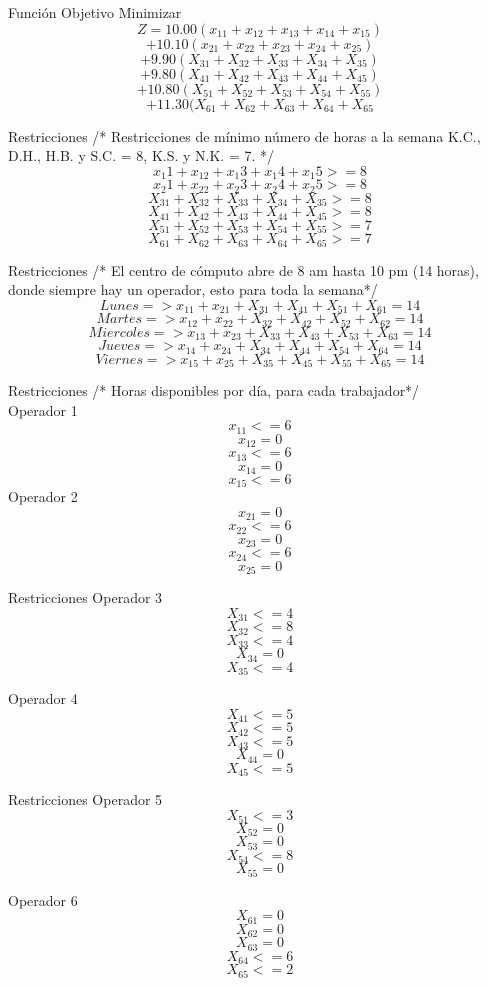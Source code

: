 \documentclass{beamer}
\begin{document}
\begin{frame}[fragile]{Funci\'on Objetivo}
Minimizar
\[Z = 10.00 (x_{11} + x_{12} +x_{13}+x_{14} +x_{15}) \]
\[+ 10.10 (x_{21} + x_{22} +x_{23}+x_{24} + x_{25})\]
\[+  9.90 (X_{31} + X_{32} +X_{33}+X_{34} +X_{35})\]
\[+ 9.80  (X_{41} + X_{42} +X_{43}+X_{44} +X_{45})\]
\[+ 10.80  (X_{51} + X_{52} +X_{53}+X_{54} +X_{55})\]
\[+ 11.30  (X_{61} + X_{62} +X_{63}+X_{64} +X_{65}\]

\end{frame}

\begin{frame}[fragile]{Restricciones}
/* Restricciones  de m\'inimo n\'umero de horas a la semana K.C., D.H., H.B. y S.C. = 8, K.S. y N.K. = 7. */\\
\[x_{1}1 + x_{12} +x_{1}3+x_{1}4 +x_{1}5 >=8\]
\[x_{2}1 + x_{22} +x_{2}3+x_{2}4 + x_{2}5 >= 8\]
\[X_{31} + X_{32} +X_{33}+X_{34} +X_{35} >= 8\]
\[X_{41} + X_{42} +X_{43}+X_{44} +X_{45} >= 8\]
\[X_{51} + X_{52} +X_{53}+X_{54} +X_{55} >= 7\]
\[X_{61} + X_{62} +X_{63}+X_{64} +X_{65} >= 7\]
\end{frame}
\begin{frame}[fragile]{Restricciones}
/* El centro de c\'omputo abre de 8 am hasta 10 pm  (14 horas), donde siempre hay un operador, esto para toda la semana*/\\
\[Lunes => x_{11} + x_{21} + X_{31} +X_{41} + X_{51} +X_{61} = 14  \]
\[Martes=> x_{12} + x_{22} + X_{32} +X_{42} + X_{52} + X_{62} = 14\]
\[Miercoles=> x_{13} + x_{23} + X_{33} +X_{43} + X_{53} +X_{63} = 14\]
\[Jueves => x_{14} + x_{24} + X_{34} +X_{44} + X_{54} +X_{64} = 14\]
\[Viernes => x_{15} + x_{25} + X_{35} +X_{45} + X_{55} +X_{65} = 14  \]

\end{frame}
\begin{frame}[fragile]{Restricciones}
/* Horas disponibles por d\'ia, para cada trabajador*/\\
Operador 1\\
    \[x_{11} <= 6\]
    \[x_{12} = 0\]
    \[x_{13} <= 6\]
    \[x_{14}  = 0\]
    \[x_{15} <= 6\]
Operador 2\\
    \[x_{21} = 0 \]
    \[x_{22} <= 6\]
    \[x_{23} = 0\]
    \[x_{24}  <= 6\]
    \[x_{25} = 0\]
\end{frame}
\begin{frame}[fragile]{Restricciones}
Operador 3\\
    \[X_{31} <= 4 \]
    \[X_{32} <= 8\]
    \[X_{33} <= 4\]
    \[X_{34}  = 0\]
    \[X_{35} <= 4\]


Operador 4\\
    \[X_{41} <= 5\]
    \[X_{42} <= 5\]
    \[X_{43} <= 5\]
    \[X_{44}  = 0\]
    \[X_{45} <= 5\]
\end{frame}
\begin{frame}[fragile]{Restricciones}
Operador 5\\
    \[X_{51} <= 3\]
    \[X_{52} = 0\]
    \[X_{53} = 0\]
    \[X_{54}  <=  8\]
    \[X_{55} = 0\]

Operador 6\\
    \[X_{61} = 0 \]
    \[X_{62} = 0\]
    \[X_{63} = 0\]
    \[X_{64}  <=  6\]
    \[X_{65} <= 2\]

\end{frame}
\end{document}
